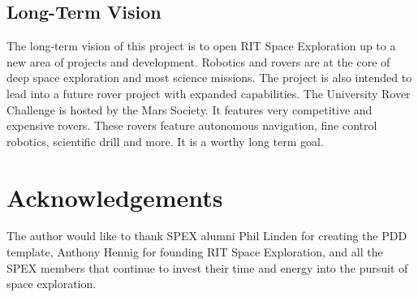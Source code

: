 \documentclass[conference]{IEEEtran} %
\begin{document}
\subsection{Long-Term Vision}
\label{sec:vision}
The long-term vision of this project is to open RIT Space Exploration up to a new area of projects and development. 
Robotics and rovers are at the core of deep space exploration and most science missions. 
The project is also intended to lead into a future rover project with expanded capabilities.
The University Rover Challenge is hosted by the Mars Society. 
It features very competitive and expensive rovers. 
These rovers feature autonomous navigation, fine control robotics, scientific drill and more. 
It is a worthy long term goal. 


\section*{Acknowledgements}
The author would like to thank SPEX alumni Phil Linden for creating the PDD template, Anthony Hennig for founding RIT Space Exploration, and all the SPEX members that continue to invest their time and energy into the pursuit of space exploration.

\onecolumn
\appendices{}
\end{document}
